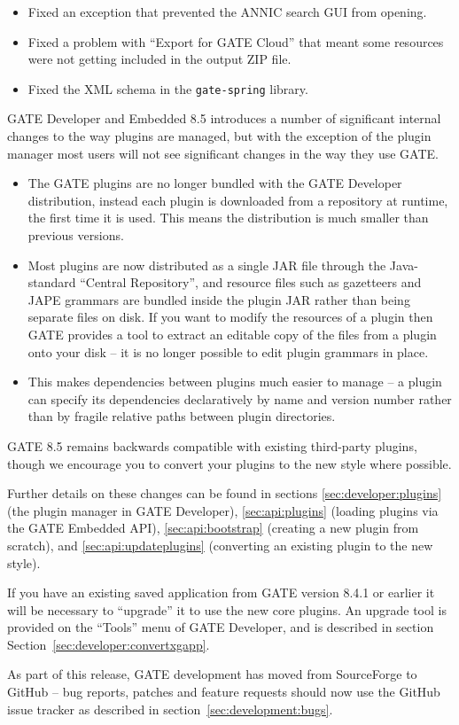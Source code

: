 \begin{itemize}
\item Fixed an exception that prevented the ANNIC search GUI from opening.
\item Fixed a problem with ``Export for GATE Cloud'' that meant some resources
  were not getting included in the output ZIP file.
\item Fixed the XML schema in the \verb!gate-spring! library.
\end{itemize}


GATE Developer and Embedded 8.5 introduces a number of significant internal
changes to the way plugins are managed, but with the exception of the plugin
manager most users will not see significant changes in the way they use GATE.

\begin{itemize}
\item The GATE plugins are no longer bundled with the GATE Developer
  distribution, instead each plugin is downloaded from a repository at runtime,
  the first time it is used.  This means the distribution is much smaller than
  previous versions.
\item Most plugins are now distributed as a single JAR file through the
  Java-standard ``Central Repository'', and resource files such as gazetteers
  and JAPE grammars are bundled inside the plugin JAR rather than being
  separate files on disk.  If you want to modify the resources of a plugin
  then GATE provides a tool to extract an editable copy of the files from
  a plugin onto your disk -- it is no longer possible to edit plugin grammars
  in place.
\item This makes dependencies between plugins much easier to manage -- a plugin
  can specify its dependencies declaratively by name and version number rather
  than by fragile relative paths between plugin directories.
\end{itemize}

GATE 8.5 remains backwards compatible with existing third-party plugins, though
we encourage you to convert your plugins to the new style where possible.

Further details on these changes can be found in sections
\ref{sec:developer:plugins} (the plugin manager in GATE Developer),
\ref{sec:api:plugins} (loading plugins via the GATE Embedded API),
\ref{sec:api:bootstrap} (creating a new plugin from scratch), and
\ref{sec:api:updateplugins} (converting an existing plugin to the new style).

If you have an existing saved application from GATE version 8.4.1 or earlier it
will be necessary to ``upgrade'' it to use the new core plugins.  An upgrade
tool is provided on the ``Tools'' menu of GATE Developer, and is described in
section Section~\ref{sec:developer:convertxgapp}.


As part of this release, GATE development has moved from SourceForge to GitHub
-- bug reports, patches and feature requests should now use the GitHub issue
tracker as described in section~\ref{sec:development:bugs}.

